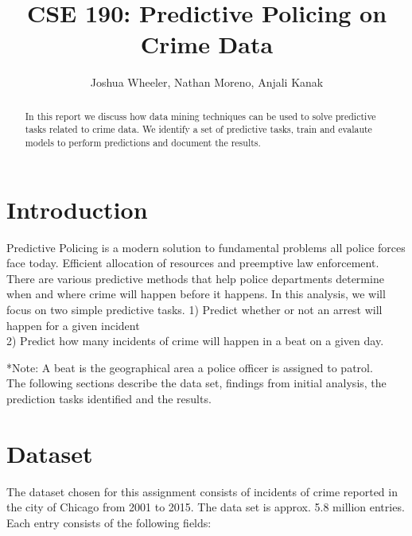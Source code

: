 \documentclass[journal]{IEEEtran}
\begin{document}
%
\title{CSE 190: Predictive Policing on Crime Data}
\author{Joshua Wheeler,  Nathan Moreno, Anjali Kanak }

\maketitle

\begin{abstract}
In this report we discuss how data mining techniques can be used to solve predictive tasks related to crime data. We identify a set of predictive tasks, train and evalaute models to perform predictions and document the results.
\end{abstract}

\section{Introduction}
Predictive Policing is a modern solution to fundamental problems all police forces face today. Efficient allocation of resources and preemptive law enforcement. There are various predictive methods that help police departments determine when and where crime will happen before it happens. In this analysis, we will focus on two simple predictive tasks.
1) Predict whether or not an arrest will happen for a given incident
\\
2) Predict how many incidents of crime will happen in a beat on a given day. 

*Note: A beat is the geographical area a police officer is assigned to patrol. \\

The following sections describe the data set, findings from initial analysis, the prediction tasks identified and the results.  

\section{Dataset}

The dataset chosen for this assignment consists of incidents of crime reported in the city of Chicago from 2001 to 2015. The data set is approx. 5.8 million entries.  Each entry consists of the following fields:\\
\end{document}
